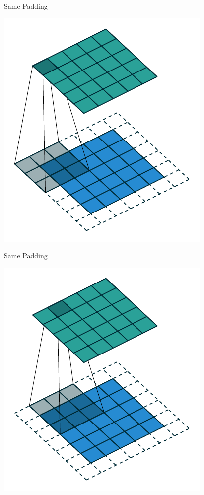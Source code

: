\documentclass[10pt]{beamer}
\begin{document}
\begin{frame}{Same Padding}
\begin{center}
\includegraphics[scale=1]{images/same_padding_no_strides_00.pdf}
\end{center}
\end{frame}

\begin{frame}{Same Padding}
\begin{center}
\includegraphics[scale=1]{images/same_padding_no_strides_01.pdf}
\end{center}
\end{frame}
\end{document}
